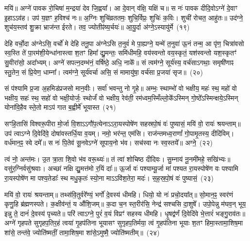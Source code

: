 मयि॑॥ अग्ने॑ पावक रो॒चिषा॑ म॒न्द्रया॑ देव जि॒ह्वया᳚। आ दे॒वान् व॑क्षि॒ यक्षि॑ च॥ स नः॑ पावक दीदि॒वो\-ऽग्ने॑ दे॒वाꣳ इ॒हा\-ऽऽ\-व॑ह। उप॑ य॒ज्ञꣳ ह॒विश्च॑ नः॥ अ॒ग्निः शुचि॑व्रततमः॒ शुचि॒र्विप्रः॒ शुचिः॑ क॒विः। शुची॑ रोचत॒ आहु॑तः॥ उद॑ग्ने॒ शुच॑य॒स्तव॑ शु॒क्रा भ्राज॑न्त ईरते। तव॒ ज्योतीꣴ॑ष्य॒र्चयः॑॥ आ॒यु॒र्दा अ॑ग्ने॒\-ऽस्यायु॑र्मे~(१९)\ip

देहि वर्चो॒दा अ॑ग्ने\-ऽसि॒ वर्चो॑ मे देहि तनू॒पा अ॑ग्ने\-ऽसि त॒नुवं॑ मे पा॒ह्यग्ने॒ यन्मे॑ त॒नुवा॑ ऊ॒नं तन्म॒ आ पृ॑ण॒ चित्रा॑वसो स्व॒स्ति ते॑ पा॒रम॑शी॒येन्धा॑नास्त्वा श॒तꣳ हिमा᳚ द्यु॒मन्तः॒ समि॑धीमहि॒ वय॑स्वन्तो वय॒स्कृतं॒ यश॑स्वन्तो यश॒स्कृतꣳ॑ सु॒वीरा॑सो॒ अदा᳚भ्यम्। अग्ने॑ सपत्न॒दम्भ॑नं॒ वर्\mbox{}षि॑ष्ठे॒ अधि॒ नाके᳚॥ सं त्वम॑ग्ने॒ सूर्य॑स्य॒ वर्च॑सा\-ऽगथाः॒ समृषी॑णाꣴ स्तु॒तेन॒ सं प्रि॒येण॒ धाम्ना᳚। त्वम॑ग्ने॒ सूर्य॑वर्चा असि॒ सं मामायु॑षा॒ वर्च॑सा प्र॒जया॑ सृज॥~(२०)\ip

{\anuvakamend[{आ॒हु॒वध्यै॑ र॒यिं मे॒ वर्च॑सा स॒प्तद॑श च}]}

सं प॑श्यामि प्र॒जा अ॒हमिड॑प्रजसो मान॒वीः। सर्वा॑ भवन्तु नो गृ॒हे॥ अम्भः॒ स्थाम्भो॑ वो भक्षीय॒ महः॑ स्थ॒ महो॑ वो भक्षीय॒ सहः॑ स्थ॒ सहो॑ वो भक्षी॒योर्जः॒ स्थोर्जं॑ वो भक्षीय॒ रेव॑ती॒ रम॑ध्वम॒स्मिँल्लो॒के᳚\-ऽस्मिन् गो॒ष्ठे᳚\-ऽस्मिन्क्षये॒\-ऽस्मिन् योना॑वि॒हैव स्ते॒तो मा\-ऽप॑ गात ब॒ह्वीर्मे॑ भूयास्त~(२१)\ip

सꣳहि॒तासि॑ विश्वरू॒पीरा मो॒र्जा वि॒शा\-ऽऽ\-गौ॑प॒त्येना\-ऽऽ\-रा॒यस्पोषे॑ण सहस्रपो॒षं वः॑ पुष्यासं॒ मयि॑ वो॒ रायः॑ श्रयन्ताम्॥ उप॑ त्वा\-ऽग्ने दि॒वेदि॑वे॒ दोषा॑वस्तर्धि॒या व॒यम्। नमो॒ भर॑न्त॒ एम॑सि। राज॑न्तमध्व॒राणां᳚ गो॒पामृ॒तस्य॒ दीदि॑विम्। वर्ध॑मान॒ꣴ॒ स्वे दमे᳚॥ स नः॑ पि॒तेव॑ सू॒नवे\-ऽग्ने॑ सूपाय॒नो भ॑व। सच॑स्वा नः स्व॒स्तये᳚॥ अग्ने॒~(२२)\ip

त्वं नो॒ अन्त॑मः। उ॒त त्रा॒ता शि॒वो भ॑व वरू॒थ्यः॑॥ तं त्वा॑ शोचिष्ठ दीदिवः। सु॒म्नाय॑ नू॒नमी॑महे॒ सखि॑भ्यः॥ वसु॑र॒ग्निर्वसु॑श्रवाः। अच्छा॑ नक्षि द्यु॒मत्त॑मो र॒यिं दाः᳚॥ ऊ॒र्जा वः॑ पश्याम्यू॒र्जा मा॑ पश्यत रा॒यस्पोषे॑ण वः पश्यामि रा॒यस्पोषे॑ण मा पश्य॒तेडाः᳚ स्थ मधु॒कृतः॑ स्यो॒ना मा\-ऽऽ\-वि॑श॒तेरा॒ मदः॑। स॒ह॒स्र॒पो॒षं वः॑ पुष्यासं॒~(२३)\ip

मयि॑ वो॒ रायः॑ श्रयन्ताम्॥ तथ्स॑वि॒तुर्वरे᳚ण्यं॒ भर्गो॑ दे॒वस्य॑ धीमहि। धियो॒ यो नः॑ प्रचो॒दया᳚त्॥ सो॒मान॒ꣴ॒ स्वर॑णं कृणु॒हि ब्र॑ह्मणस्पते। क॒क्षीव॑न्तं॒ य औ॑शि॒जम्॥ क॒दा च॒न स्त॒रीर॑सि॒ नेन्द्र॑ सश्चसि दा॒शुषे᳚। उपो॒पेन्नु म॑घव॒न् भूय॒ इन्नु ते॒ दानं॑ दे॒वस्य॑ पृच्यते॥ परि॑ त्वा\-ऽग्ने॒ पुरं॑ व॒यं विप्रꣳ॑ सहस्य धीमहि। धृ॒षद्व॑र्णं दि॒वेदि॑वे भे॒त्तारं॑ भङ्गु॒राव॑तः॥ अग्ने॑ गृहपते सुगृहप॒तिर॒हं त्वया॑ गृ॒हप॑तिना भूयासꣳ सुगृहप॒तिर्मया॒ त्वं गृ॒हप॑तिना भूयाः श॒तꣳ हिमा॒स्तामा॒शिष॒मा शा॑से॒ तन्त॑वे॒ ज्योति॑ष्मतीं॒ तामा॒शिष॒मा शा॑से॒\-ऽमुष्मै॒ ज्योति॑ष्मतीम्॥~(२४)\ip

